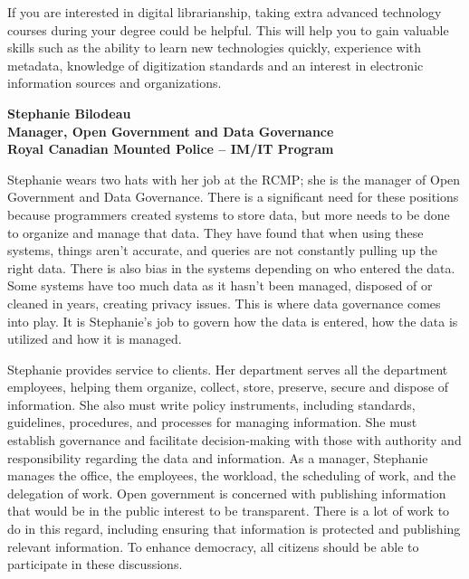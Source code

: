 \documentclass[
  letterpaper,
  DIV=11,
  numbers=noendperiod]{scrreprt}
\begin{document}
If you are interested in digital librarianship, taking extra advanced
technology courses during your degree could be helpful. This will help
you to gain valuable skills such as the ability to learn new
technologies quickly, experience with metadata, knowledge of
digitization standards and an interest in electronic information sources
and organizations.

\begin{tcolorbox}[enhanced jigsaw, arc=.35mm, bottomrule=.15mm, bottomtitle=1mm, breakable, colback=white, colbacktitle=quarto-callout-tip-color!10!white, colframe=quarto-callout-tip-color-frame, coltitle=black, left=2mm, leftrule=.75mm, opacityback=0, opacitybacktitle=0.6, rightrule=.15mm, title=\textcolor{quarto-callout-tip-color}{\faLightbulb}\hspace{0.5em}{Meet a professional}, titlerule=0mm, toprule=.15mm, toptitle=1mm]

\textbf{Stephanie Bilodeau\\
Manager, Open Government and Data Governance\\
Royal Canadian Mounted Police -- IM/IT Program}

Stephanie wears two hats with her job at the RCMP; she is the manager of
Open Government and Data Governance. There is a significant need for
these positions because programmers created systems to store data, but
more needs to be done to organize and manage that data. They have found
that when using these systems, things aren't accurate, and queries are
not constantly pulling up the right data. There is also bias in the
systems depending on who entered the data. Some systems have too much
data as it hasn't been managed, disposed of or cleaned in years,
creating privacy issues. This is where data governance comes into play.
It is Stephanie's job to govern how the data is entered, how the data is
utilized and how it is managed.

Stephanie provides service to clients. Her department serves all the
department employees, helping them organize, collect, store, preserve,
secure and dispose of information. She also must write policy
instruments, including standards, guidelines, procedures, and processes
for managing information. She must establish governance and facilitate
decision-making with those with authority and responsibility regarding
the data and information. As a manager, Stephanie manages the office,
the employees, the workload, the scheduling of work, and the delegation
of work. Open government is concerned with publishing information that
would be in the public interest to be transparent. There is a lot of
work to do in this regard, including ensuring that information is
protected and publishing relevant information. To enhance democracy, all
citizens should be able to participate in these discussions.


\end{tcolorbox}
\end{document}
